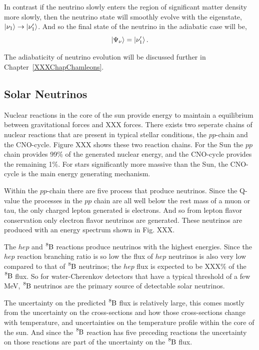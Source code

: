 In contrast if the neutrino slowly enters the region of significant matter
density more slowly, then the neutrino state will smoothly evolve with the
eigenstate, $\ket{\nu_{1}} \rightarrow \ket{\nu_{1}^{\prime}}$.
And so the final state of the neutrino in the adiabatic case will be,
\begin{equation*}
    \ket{\Psi_{\nu}} = \ket{\nu_{1}^{\prime}}\text{.}
\end{equation*}

The adiabaticity of neutrino evolution will be discussed further in
Chapter~\ref{XXXChapChamleons}.

\subsection{Solar Neutrinos}
Nuclear reactions in the core of the sun provide energy to maintain a equilibrium
between gravitational forces and XXX forces.
There exists two seperate chains of nuclear reactions that are present in typical
stellar conditions, the $pp$-chain and the CNO-cycle. Figure XXX shows these
two reaction chains.
For the Sun the $pp$ chain
provides 99\% of the generated nuclear energy, and the CNO-cycle provides the remaining
1\%. For stars significantly more massive than the Sun, the CNO-cycle is the
main energy generating mechanism.

Within the $pp$-chain there are five process that produce neutrinos.
Since the Q-value the processes in the $pp$ chain are all well below the rest mass
of a muon or tau, the only charged lepton generated is electrons. And so from
lepton flavor conservation only electron flavor neutrinos are generated.
These neutrinos are produced with an energy spectrum shown in Fig. XXX.

The $hep$ and $\ce{^{8}B}$ reactions produce neutrinos with the highest
energies. Since the $hep$ reaction branching ratio is so low the flux
of $hep$ neutrinos is also very low compared to that of $\ce{^{8}B}$ neutrinos;
the $hep$ flux is expected to be XXX\% of the $\ce{^{8}B}$ flux.
So for water-Cherenkov detectors that have a typical threshold of a few MeV, $\ce{^{8}B}$ neutrinos
are the primary source of detectable solar neutrinos.

The uncertainty on the predicted $\ce{^{8}B}$ flux is relatively large, this comes mostly
from the uncertainty on the cross-sections and how those cross-sections change with
temperature, and uncertainties on the temperature profile within the core of the sun.
And since the $\ce{^{8}B}$ reaction has five preceding reactions the uncertainty on
 those reactions are part of the uncertainty on the $\ce{^{8}B}$ flux.

